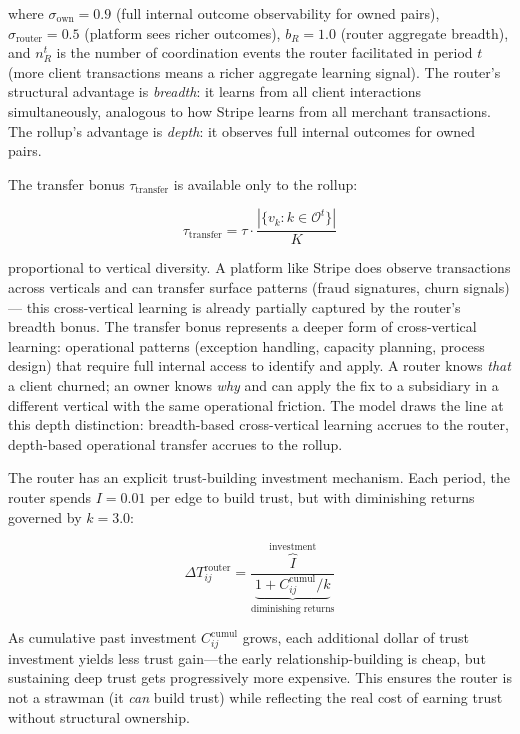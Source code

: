 \documentclass[12pt]{article}
\theoremstyle{definition}
\begin{document}
\noindent where $\sigma_{\text{own}} = 0.9$ (full internal outcome observability for owned pairs), $\sigma_{\text{router}} = 0.5$ (platform sees richer outcomes), $b_R = 1.0$ (router aggregate breadth), and $n_R^t$ is the number of coordination events the router facilitated in period $t$ (more client transactions means a richer aggregate learning signal). The router's structural advantage is \textit{breadth}: it learns from all client interactions simultaneously, analogous to how Stripe learns from all merchant transactions. The rollup's advantage is \textit{depth}: it observes full internal outcomes for owned pairs.

The transfer bonus $\tau_{\text{transfer}}$ is available only to the rollup:

\begin{equation}
\tau_{\text{transfer}} = \tau \cdot \frac{|\{v_k : k \in \mathcal{O}^t\}|}{K}
\end{equation}

\noindent proportional to vertical diversity. A platform like Stripe does observe transactions across verticals and can transfer surface patterns (fraud signatures, churn signals) --- this cross-vertical learning is already partially captured by the router's breadth bonus. The transfer bonus represents a deeper form of cross-vertical learning: operational patterns (exception handling, capacity planning, process design) that require full internal access to identify and apply. A router knows \textit{that} a client churned; an owner knows \textit{why} and can apply the fix to a subsidiary in a different vertical with the same operational friction. The model draws the line at this depth distinction: breadth-based cross-vertical learning accrues to the router, depth-based operational transfer accrues to the rollup.

The router has an explicit trust-building investment mechanism. Each period, the router spends $I = 0.01$ per edge to build trust, but with diminishing returns governed by $k = 3.0$:

\begin{equation}
\Delta T_{ij}^{\text{router}} = \frac{\overbrace{I}^{\text{investment}}}{\underbrace{1 + C_{ij}^{\text{cumul}} / k}_{\text{diminishing returns}}}
\end{equation}

\noindent As cumulative past investment $C_{ij}^{\text{cumul}}$ grows, each additional dollar of trust investment yields less trust gain---the early relationship-building is cheap, but sustaining deep trust gets progressively more expensive. This ensures the router is not a strawman (it \textit{can} build trust) while reflecting the real cost of earning trust without structural ownership.
\end{document}

